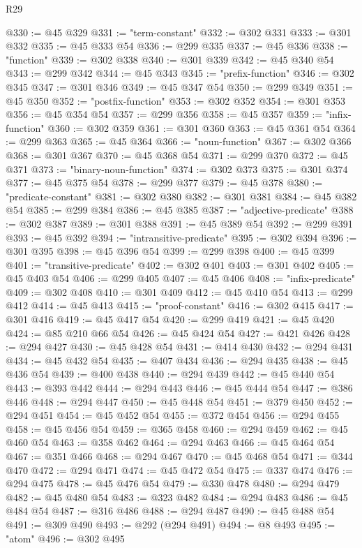 \begin{lexlean}{R29}
\begin{coremodule}
@330 := @45 @329
@331 := "term-constant"
@332 := @302 @331
@333 := @301 @332
@335 := @45 @333 @54
@336 := @299 @335
@337 := @45 @336
@338 := "function"
@339 := @302 @338
@340 := @301 @339
@342 := @45 @340 @54
@343 := @299 @342
@344 := @45 @343
@345 := "prefix-function"
@346 := @302 @345
@347 := @301 @346
@349 := @45 @347 @54
@350 := @299 @349
@351 := @45 @350
@352 := "postfix-function"
@353 := @302 @352
@354 := @301 @353
@356 := @45 @354 @54
@357 := @299 @356
@358 := @45 @357
@359 := "infix-function"
@360 := @302 @359
@361 := @301 @360
@363 := @45 @361 @54
@364 := @299 @363
@365 := @45 @364
@366 := "noun-function"
@367 := @302 @366
@368 := @301 @367
@370 := @45 @368 @54
@371 := @299 @370
@372 := @45 @371
@373 := "binary-noun-function"
@374 := @302 @373
@375 := @301 @374
@377 := @45 @375 @54
@378 := @299 @377
@379 := @45 @378
@380 := "predicate-constant"
@381 := @302 @380
@382 := @301 @381
@384 := @45 @382 @54
@385 := @299 @384
@386 := @45 @385
@387 := "adjective-predicate"
@388 := @302 @387
@389 := @301 @388
@391 := @45 @389 @54
@392 := @299 @391
@393 := @45 @392
@394 := "intransitive-predicate"
@395 := @302 @394
@396 := @301 @395
@398 := @45 @396 @54
@399 := @299 @398
@400 := @45 @399
@401 := "transitive-predicate"
@402 := @302 @401
@403 := @301 @402
@405 := @45 @403 @54
@406 := @299 @405
@407 := @45 @406
@408 := "infix-predicate"
@409 := @302 @408
@410 := @301 @409
@412 := @45 @410 @54
@413 := @299 @412
@414 := @45 @413
@415 := "proof-constant"
@416 := @302 @415
@417 := @301 @416
@419 := @45 @417 @54
@420 := @299 @419
@421 := @45 @420
@424 := @85 @210 @66 @54
@426 := @45 @424 @54
@427 := @421 @426
@428 := @294 @427
@430 := @45 @428 @54
@431 := @414 @430
@432 := @294 @431
@434 := @45 @432 @54
@435 := @407 @434
@436 := @294 @435
@438 := @45 @436 @54
@439 := @400 @438
@440 := @294 @439
@442 := @45 @440 @54
@443 := @393 @442
@444 := @294 @443
@446 := @45 @444 @54
@447 := @386 @446
@448 := @294 @447
@450 := @45 @448 @54
@451 := @379 @450
@452 := @294 @451
@454 := @45 @452 @54
@455 := @372 @454
@456 := @294 @455
@458 := @45 @456 @54
@459 := @365 @458
@460 := @294 @459
@462 := @45 @460 @54
@463 := @358 @462
@464 := @294 @463
@466 := @45 @464 @54
@467 := @351 @466
@468 := @294 @467
@470 := @45 @468 @54
@471 := @344 @470
@472 := @294 @471
@474 := @45 @472 @54
@475 := @337 @474
@476 := @294 @475
@478 := @45 @476 @54
@479 := @330 @478
@480 := @294 @479
@482 := @45 @480 @54
@483 := @323 @482
@484 := @294 @483
@486 := @45 @484 @54
@487 := @316 @486
@488 := @294 @487
@490 := @45 @488 @54
@491 := @309 @490
@493 := @292 (@294 @491)
@494 := @8 @493
@495 := "atom"
@496 := @302 @495

\end{coremodule}
\end{lexlean}
